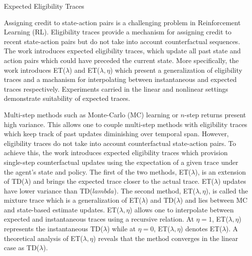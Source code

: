 \documentclass[11pt,letterpaper]{article}
\begin{document}
\begin{center}
  \large{Expected Eligibility Traces}
\end{center}

Assigning credit to state-action pairs is a challenging problem in Reinforcement Learning (RL). Eligibility traces provide a mechanism for assigning credit to recent state-action pairs but do not take into account counterfactual sequences. The work introduces expected eligibility traces, which update all past state and action pairs which could have preceded the current state. More specifically, the work introduces ET($\lambda$) and ET($\lambda,\eta$) which present a generalization of eligibility traces and a machanism for interpolating between instantaneous and expected traces respectively. Experiments carried in the linear and nonlinear settings demonstrate suitability of expected traces. 

Multi-step methods such as Monte-Carlo (MC) learning or $n$-step returns present high variance. This allows one to couple multi-step methods with eligibility traces which keep track of past updates diminishing over temporal span. However, eligibility traces do not take into account counterfactual state-action pairs. To achieve this, the work introduces expected eligibility traces which provision single-step counterfactual updates using the expectation of a given trace under the agent's state and policy. The first of the two methods, ET($\lambda$), is an extension of TD($\lambda$) and brings the expected trace closer to the actual trace. ET($\lambda$) updates have lower variance than TD($lambda$). The second method, ET($\lambda,\eta$), is called the mixture trace which is a generalization of ET($\lambda$) and TD($\lambda$) and lies between MC and state-based estimate updates. ET($\lambda,\eta$) allows one to interpolate between expected and instantaneous traces using a recursive relation. At $\eta=1$, ET($\lambda,\eta$) represents the instantaneous TD($\lambda$) while at $\eta=0$, ET($\lambda,\eta$) denotes ET($\lambda$). A theoretical analysis of ET($\lambda,\eta$) reveals that the method converges in the linear case as TD($\lambda$). 
\end{document}
